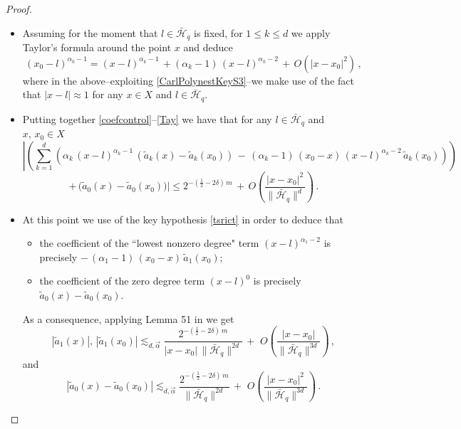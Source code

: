 \documentclass[a4paper,reqno]{amsart}
\numberwithin{equation}{section}
\theoremstyle{definition}
\def\beq{\begin{equation}}
\def\eeq{\end{equation}}
\def\beq{\begin{equation}}
\def\eeq{\end{equation}}
\def\a{\alpha}
\def\beq{\begin{equation}}
\def\eeq{\end{equation}}
\def\beq{\begin{equation}}
\def\eeq{\end{equation}}
\def\d{\delta}
\begin{document}
\begin{proof}
\begin{itemize}
\item Assuming for the moment that $l\in \bar{\mathcal{H}}_q$ is fixed, for $1\leq k\leq d$ we apply Taylor's formula around the point $x$ and deduce
 \beq\label{Tay}
(x_0-l)^{\a_k-1}= (x-l)^{\a_k-1}\,+(\a_k-1)\,(x-l)^{\a_k-2}\,+\,O(|x-x_0|^2)\,,
\eeq
 where in the above--exploiting \eqref{CarlPolynestKeyS3}--we make use of the fact that $|x-l|\approx 1$ for any $x\in X$ and $l\in \bar{\mathcal{H}}_q$.
\item Putting together \eqref{coefcontrol}--\eqref{Tay} we have that for any $l\in \bar{\mathcal{H}}_q$ and $x,\,x_0\in X$
 \beq\label{Tay}
 \eeq
$$\left|\left(\sum_{k=1}^d \left(\a_k\,(x-l)^{\a_k-1}\,(\tilde{a}_k(x)-\tilde{a}_k(x_0))\,-\,(\a_k-1)\,(x_0-x)\,(x-l)^{\a_k-2}\,\tilde{a}_k(x_0)\right)\right)\right.$$
$$+\,\Big(\tilde{a}_0(x)-\tilde{a}_0(x_0)\Big)\Big|\leq 2^{-(\frac{1}{2}-2\d)\,m}\,+\,O\left(\frac{|x-x_0|^2}{\|\bar{\mathcal{H}}_q\|^d}\right)\,.$$

\item At this point we use of the key hypothesis \eqref{tsrict} in order to deduce that
\begin{itemize}
\item the coefficient of the ``lowest nonzero degree" term $(x-l)^{\a_1-2}$ is precisely $-\,(\a_1-1)\,(x_0-x)\,\tilde{a}_1(x_0)$;

\item the coefficient of the zero degree term $(x-l)^{0}$ is precisely $\tilde{a}_0(x)-\tilde{a}_0(x_0)$.
\end{itemize}

As a consequence, applying Lemma 51 in \cite{Lie19} we get
\beq\label{a1}
|\tilde{a}_1(x)|,\,|\tilde{a}_1(x_0)|\lesssim_{d,\vec{\a}} \frac{2^{-(\frac{1}{2}-2\d)\,m}}{|x-x_0|\,\|\bar{\mathcal{H}}_q\|^{2d}}\,+\,
  \,O\left(\frac{|x-x_0|}{\|\bar{\mathcal{H}}_q\|^{3d}}\right)\,,
\eeq
and
\beq\label{0degree}
|\tilde{a}_0(x)-\tilde{a}_0(x_0)|\lesssim_{d,\vec{\a}} \frac{2^{-(\frac{1}{2}-2\d)\,m}}{\|\bar{\mathcal{H}}_q\|^{2d}}\,+\,
  \,O\left(\frac{|x-x_0|^2}{\|\bar{\mathcal{H}}_q\|^{3d}}\right)\,.
\eeq


\end{itemize}
\end{proof}
\end{document}

